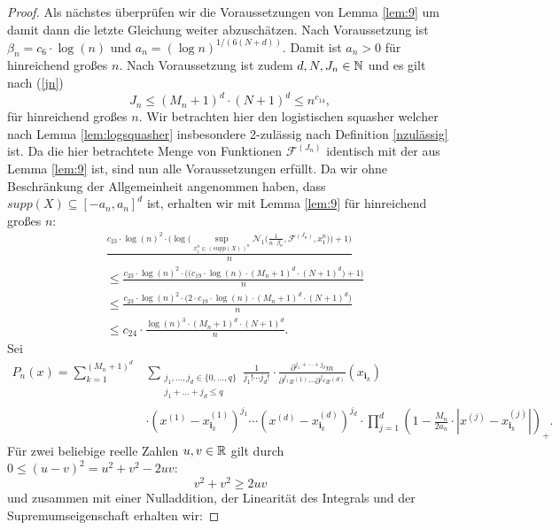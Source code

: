\begin{proof}
Als nächstes überprüfen wir die Voraussetzungen von Lemma \ref{lem:9} um damit dann die letzte Gleichung weiter abzuschätzen.
Nach Voraussetzung ist $\beta_n = c_6 \cdot \log(n)$ und $a_n = (\log n)^{1/(6(N + d))}.$ Damit ist $a_n > 0$ für hinreichend großes $n$. Nach Voraussetzung ist zudem $d, N, J_n \in \mathbb{N}$ und es gilt nach (\ref{jn}) 
$$J_n \leq (M_n + 1)^d \cdot (N + 1)^d \leq n^{c_{14}},$$
für hinreichend großes $n$. Wir betrachten hier den logistischen squasher welcher nach Lemma \ref{lem:logsquasher} insbesondere 2-zulässig nach Definition \ref{nzulässig} ist. Da die hier betrachtete Menge von Funktionen $\mathcal{F}^{(J_n)}$ identisch mit der aus Lemma \ref{lem:9} ist, sind nun alle Voraussetzungen erfüllt. Da wir ohne Beschränkung der Allgemeinheit angenommen haben, dass $supp(X) \subseteq [-a_n, a_n]^d$ ist, erhalten wir mit Lemma \ref{lem:9} für hinreichend großes $n$:
\begin{equation}
\label{lem9sol}
\begin{split}
& \frac{c_{23} \cdot \log(n)^2 \cdot \big(\log\big(\sup_{x_1^n \in (supp(X))^n}\mathcal{N}_1\big(\frac{1}{n \cdot \beta_n},\mathcal{F}^{(J_n)},x_1^n\big)\big) + 1\big)}{n} \\
& \leq \frac{c_{23} \cdot \log(n)^2 \cdot \big(\big(c_{19} \cdot \log(n) \cdot (M_n + 1)^d \cdot (N + 1)^d \big) + 1\big)}{n} \\
& \leq \frac{c_{23} \cdot \log(n)^2 \cdot \big(2 \cdot c_{19} \cdot \log(n) \cdot (M_n + 1)^d \cdot (N + 1)^d\big)}{n} \\
& \leq c_{24} \cdot \frac{\log(n)^3 \cdot (M_n + 1)^d \cdot (N + 1)^d}{n}.
\end{split}
\end{equation}
Sei 
\begin{equation*}
\begin{split}
P_n(x) = \sum_{k = 1}^{(M_n + 1)^d} & \sum_{\substack{ j_1,\dots,j_d \in \{0,\dots,q\} \\j_1+\dots +j_d \leq q}} \frac{1}{j_1! \cdots j_d!} \cdot \frac{\partial^{j_1+\cdots + j_d} m}{\partial^{j_1} x^{(1)}\cdots \partial^{j_d} x^{(d)}}(x_{\mathbf{i}_k}) \\
&  \cdot (x^{(1)} - x_{\mathbf{i}_k}^{(1)})^{j_1} \cdots (x^{(d)} - x_{\mathbf{i}_k}^{(d)})^{j_d} \cdot \prod_{j = 1}^d(1 - \frac{M_n}{2a_n} \cdot |x^{(j)} - x_{\mathbf{i}_k}^{(j)}|)_+. 
\end{split}
\end{equation*}
Für zwei beliebige reelle Zahlen $u, v \in \mathbb{R}$ gilt durch $0 \leq (u - v)^2 = u^2 + v^2 - 2uv$:
$$v^2 + v^2 \geq 2uv$$ und zusammen mit einer Nulladdition, der Linearität des Integrals und der Supremumseigenschaft erhalten wir:

\end{proof}
